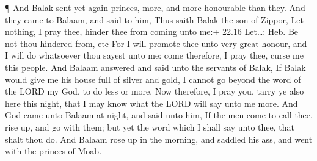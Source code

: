  ¶ And Balak sent yet again princes, more, and more
honourable than they.  And they came to Balaam, and said to
him, Thus saith Balak the son of Zippor, Let nothing, I pray thee,
hinder thee from coming unto me:+ 22.16 Let\ldots: Heb. Be not thou
hindered from, etc  For I will promote thee unto very great
honour, and I will do whatsoever thou sayest unto me: come therefore, I
pray thee, curse me this people.  And Balaam answered and
said unto the servants of Balak, If Balak would give me his house full
of silver and gold, I cannot go beyond the word of the LORD my God, to
do less or more.  Now therefore, I pray you, tarry ye also
here this night, that I may know what the LORD will say unto me more.
 And God came unto Balaam at night, and said unto him, If
the men come to call thee, rise up, and go with them; but yet the word
which I shall say unto thee, that shalt thou do.  And
Balaam rose up in the morning, and saddled his ass, and went with the
princes of Moab.

